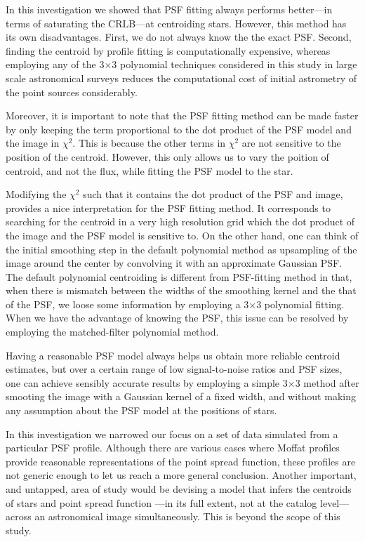 \documentclass[12pt, preprint]{aastex}
\begin{document}
In this investigation we showed that PSF fitting always performs better---in terms of saturating the CRLB---at centroiding stars.
However, this method has its own disadvantages. First, we do not always know the the exact PSF. Second, finding
 the centroid by profile fitting is computationally expensive, whereas employing any of the 3$\times$3 polynomial techniques 
considered in this study in large scale astronomical surveys reduces the computational cost
of initial astrometry of the point sources considerably. 

Moreover, it is important to note that the PSF fitting method can be made faster by only keeping the 
term proportional to the dot product of the PSF model and the image in $\chi^2$. This is because 
the other terms in $\chi^{2}$ are not sensitive to the position of the centroid. However, this only allows
us to vary the poition of centroid, and not the flux, while fitting the PSF model
to the star. 

Modifying the $\chi^2$ such that it contains the dot product of the PSF and image, 
provides a nice interpretation for the PSF fitting method. It corresponds to searching for the 
centroid in a very high resolution grid which the dot product of the image and the PSF model is
sensitive to. On the other hand, one can think of the initial smoothing step in the default polynomial method 
as upsampling of the image around the center by convolving it with an approximate Gaussian PSF. 
The default polynomial centroiding is different from PSF-fitting method in that, when there is mismatch between the
widths of the smoothing kernel and the that of the PSF, we loose some information by employing a 3$\times$3 polynomial fitting.
When we have the advantage of knowing the PSF, this issue can be resolved by employing the matched-filter polynomial method.

Having a reasonable PSF model always helps us obtain more reliable centroid estimates, but
over a certain range of low signal-to-noise ratios and PSF sizes, one can achieve sensibly
 accurate results by employing a simple 3$\times$3 method after smooting the image with
 a Gaussian kernel of a fixed width, and without making any assumption about the PSF model at the positions of stars.

In this investigation we narrowed our focus on a set of data simulated from a particular
PSF profile. Although there are various cases where Moffat profiles provide reasonable
representations of the point spread function, these profiles are not generic enough to let us
reach a more general conclusion. Another important, and untapped, area of study
would be devising a model that infers the centroids of stars and point spread function
---in its full extent, not at the catalog level---across an astronomical image simultaneously.
This is beyond the scope of this study. 
\end{document}
